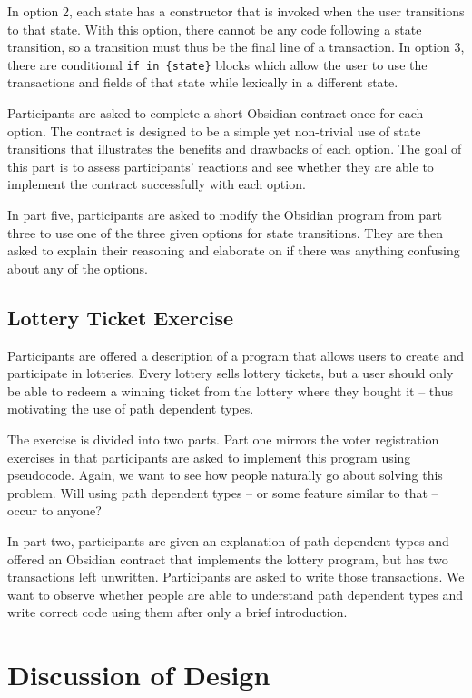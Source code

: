 \documentclass[sigplan,10pt,review]{acmart}\settopmatter{printfolios=true}
\begin{document}
In option 2, each state has a constructor that is invoked when the user transitions to that state. With this
option, there cannot be any code following a state transition, so a transition must thus be the final line of a 
transaction. In option 3, there are conditional \texttt{\small{if in \{state\}}} blocks which allow the user
to use the transactions and fields of that state while lexically in a different state. 

Participants are asked to complete a short Obsidian contract once for each option. The contract is 
designed to be a simple yet non-trivial use of state transitions that illustrates the benefits and drawbacks of each 
option. The goal of this part is to assess participants' reactions and see whether they are able to implement the 
contract successfully with each option.

In part five, participants are asked to modify the Obsidian program from part three to use one of the three given 
options for state transitions. They are then asked to explain their reasoning and elaborate on if there was 
anything confusing about any of the options. 

\subsection{Lottery Ticket Exercise}
	
Participants are offered a description of a program that allows users to create and participate in lotteries. Every 
lottery sells lottery tickets, but a user should only be able to redeem a winning ticket from the lottery where they 
bought it -- thus motivating the use of path dependent types. 

The exercise is divided into two parts. Part one mirrors the voter registration exercises in that participants are 
asked to implement this program using pseudocode. Again, we want to see how people naturally go about 
solving this problem. Will using path dependent types -- or some feature similar to that -- occur to anyone?
	
In part two, participants are given an explanation of path dependent types and offered an Obsidian contract that 
implements the lottery program, but has two transactions left unwritten. Participants are asked to write 
those transactions. We want to observe whether people are able to understand path dependent types and write 
correct code using them after only a brief introduction. 

\section{Discussion of Design}
\end{document}
